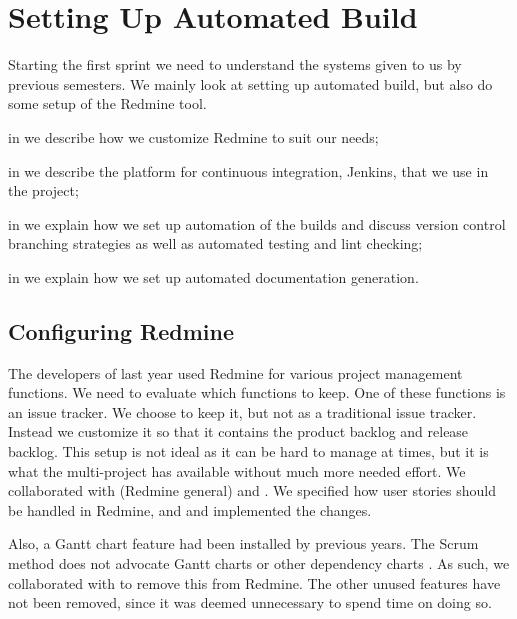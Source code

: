 \chapter{Setting Up Automated Build}\label{chap:config_management}
Starting the first sprint we need to understand the systems given to us by previous semesters. We mainly look at setting up automated build, but also do some setup of the Redmine tool.

\begin{chapterorganization}
  \item in  we describe how we customize Redmine to suit our needs;
  \item in  we describe the platform for continuous integration, Jenkins, that we use in the project;
  \item in  we explain how we set up automation of the builds and discuss version control branching strategies as well as automated testing and lint checking;
  \item in  we explain how we set up automated documentation generation.
\end{chapterorganization}

\section{Configuring Redmine}\label{sec:redmine-conf}
The developers of last year used Redmine for various project management functions. We need to evaluate which functions to keep.
One of these functions is an issue tracker. We choose to keep it, but not as a traditional issue tracker.  Instead we customize it so that it contains the product backlog and release backlog.  This setup is not ideal as it can be hard to manage at times, but it is what the multi-project has available without much more needed effort. We collaborated with  (Redmine general) and . We specified how user stories should be handled in Redmine, and  and  implemented the changes.

Also, a Gantt chart feature had been installed by previous years. The Scrum method does not advocate Gantt charts or other dependency charts \parencite{larman2003}. As such, we collaborated with  to remove this from Redmine. The other unused features have not been removed, since it was deemed unnecessary to spend time on doing so.

